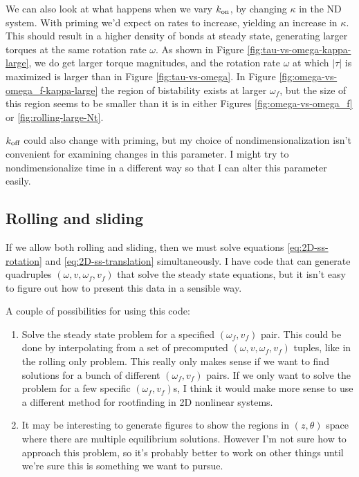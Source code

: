 \documentclass{article}
\newcommand{\tn}{\textnormal}
\begin{document}
We can also look at what happens when we vary $k_\tn{on}$, by changing
$\kappa$ in the ND system. With priming we'd expect on rates to
increase, yielding an increase in $\kappa$. This should result in a
higher density of bonds at steady state, generating larger torques at
the same rotation rate $\omega$. As shown in Figure
\ref{fig:tau-vs-omega-kappa-large}, we do get larger torque
magnitudes, and the rotation rate $\omega$ at which $|\tau|$ is
maximized is larger than in Figure \ref{fig:tau-vs-omega}. In Figure
\ref{fig:omega-vs-omega_f-kappa-large} the region of bistability
exists at larger $\omega_f$, but the size of this region seems to be
smaller than it is in either Figures \ref{fig:omega-vs-omega_f} or
\ref{fig:rolling-large-Nt}. 

$k_\tn{off}$ could also change with priming, but my
choice of nondimensionalization isn't convenient for examining changes
in this parameter. I might try to nondimensionalize time in a
different way so that I can alter this parameter easily. 

\subsection{Rolling and sliding}
\label{sec:rolling-sliding}

If we allow both rolling and sliding, then we must solve equations
\eqref{eq:2D-ss-rotation} and \eqref{eq:2D-ss-translation}
simultaneously. I have code that can generate quadruples $(\omega, v,
\omega_f, v_f)$ that solve the steady state equations, but it isn't
easy to figure out how to present this data in a sensible way. 

A couple of possibilities for using this code:
\begin{enumerate}
\item Solve the steady state problem for a specified $(\omega_f, v_f)$
  pair. This could be done by interpolating from a set of precomputed
  $(\omega, v, \omega_f, v_f)$ tuples, like in the rolling only
  problem. This really only makes sense if we want to find solutions
  for a bunch of different $(\omega_f, v_f)$ pairs. If we only want to
  solve the problem for a few specific $(\omega_f, v_f)$s, I think it
  would make more sense to use a different method for rootfinding in 2D
  nonlinear systems. 
\item It may be interesting to generate figures to show the regions in $(z,
  \theta)$ space where there are multiple equilibrium
  solutions. However I'm not sure how to approach this problem, so
  it's probably better to work on other things until we're sure this
  is something we want to pursue.
\end{enumerate}
\end{document}
